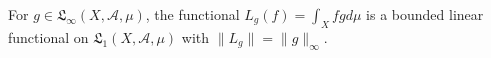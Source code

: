 For $g \in \mathfrak{L}_{\infty}(X, \mathcal{A}, \mu)$, the functional $L_g(f) = \int_X f g d\mu$ is a bounded linear functional on $\mathfrak{L}_1(X, \mathcal{A}, \mu)$ with $\|L_g\| = \|g\|_{\infty}$.
